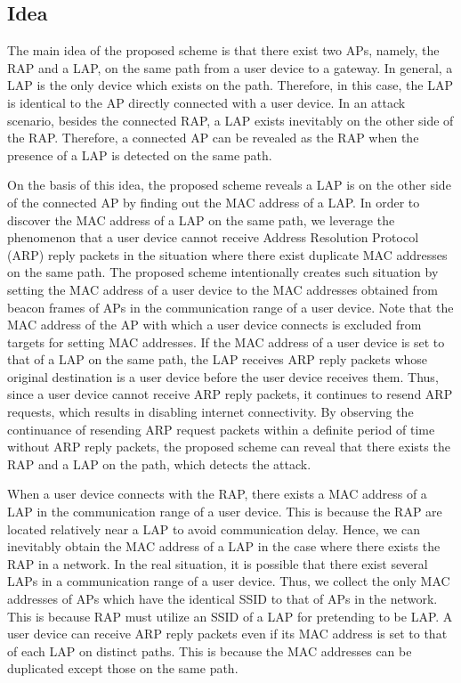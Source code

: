 \documentclass[conference]{IEEEtran}
\begin{document}
\subsection{Idea}
The main idea of the proposed scheme is that there exist two APs, namely, the RAP and a LAP, on the same path from a user device to a gateway.
In general, a LAP is the only device which exists on the path.
Therefore, in this case, the LAP is identical to the AP directly connected with a user device.
In an attack scenario, besides the connected RAP, a LAP exists inevitably on the other side of the RAP.
Therefore, a connected AP can be revealed as the RAP when the presence of a LAP is detected on the same path.

On the basis of this idea, the proposed scheme reveals a LAP is on the other side of the connected AP by finding out the MAC address of a LAP.
In order to discover the MAC address of a LAP on the same path, we leverage the phenomenon that a user device cannot receive Address Resolution Protocol (ARP) reply packets in the situation where there exist duplicate MAC addresses on the same path.
The proposed scheme intentionally creates such situation by setting the MAC address of a user device to the MAC addresses obtained from beacon frames of APs in the communication range of a user device.
Note that the MAC address of the AP with which a user device connects is excluded from targets for setting MAC addresses.
If the MAC address of a user device is set to that of a LAP on the same path, the LAP receives ARP reply packets whose original destination is a user device before the user device receives them.
Thus, since a user device cannot receive ARP reply packets, it continues to resend ARP requests, which results in disabling internet connectivity.
By observing the continuance of resending ARP request packets within a definite period of time without ARP reply packets, the proposed scheme can reveal that there exists the RAP and a LAP on the path, which detects the attack. %

When a user device connects with the RAP, there exists a MAC address of a LAP in the communication range of a user device.
This is because the RAP are located relatively near a LAP to avoid communication delay.
Hence, we can inevitably obtain the MAC address of a LAP in the case where there exists the RAP in a network.
In the real situation, it is possible that there exist several LAPs in a communication range of a user device.
Thus, we collect the only MAC addresses of APs which have the identical SSID to that of APs in the network.
This is because RAP must utilize an SSID of a LAP for pretending to be LAP.
A user device can receive ARP reply packets even if its MAC address is set to that of each LAP on distinct paths.
This is because the MAC addresses can be duplicated except those on the same path.
\end{document}
